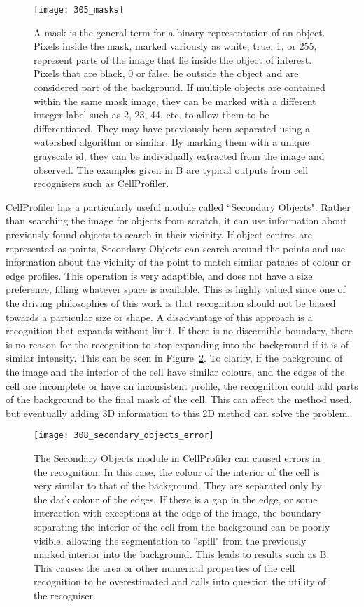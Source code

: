 \begin{figure}[h!]
 \centering
 \texttt{[image: 305\_masks]}
 \caption[Object masks]{
 	A mask is the general term for a binary representation of an object. Pixels inside the mask, marked variously as white, true, 1, or 255, represent parts of the image that lie inside the object of interest. Pixels that are black, 0 or false, lie outside the object and are considered part of the background. If multiple objects are contained within the same mask image, they can be marked with a different integer label such as 2, 23, 44, etc. to allow them to be differentiated. They may have previously been separated using a watershed algorithm or similar. By marking them with a unique grayscale id, they can be individually extracted from the image and observed. The examples given in B are typical outputs from cell recognisers such as CellProfiler.
 }
 \label{fig:masks}
\end{figure}

CellProfiler has a particularly useful module called ``Secondary Objects". Rather than searching the image for objects from scratch, it can use information about previously found objects to search in their vicinity. If object centres are represented as points, Secondary Objects can search around the points and use information about the vicinity of the point to match similar patches of colour or edge profiles. This operation is very adaptible, and does not have a size preference, filling whatever space is available. This is highly valued since one of the driving philosophies of this work is that recognition should not be biased towards a particular size or shape. A disadvantage of this approach is a recognition that expands without limit. If there is no discernible boundary, there is no reason for the recognition to stop expanding into the background if it is of similar intensity. This can be seen in Figure~\ref{fig:secondaryobjecterror}. To clarify, if the background of the image and the interior of the cell have similar colours, and the edges of the cell are incomplete or have an inconsistent profile, the recognition could add parts of the background to the final mask of the cell. This can affect the method used, but eventually adding 3D information to this 2D method can solve the problem.

\begin{figure}[h!]
 \centering
 \texttt{[image: 308\_secondary\_objects\_error]}
 \caption[Secondary object error example]{
 	The Secondary Objects module in CellProfiler can caused errors in the recognition. In this case, the colour of the interior of the cell is very similar to that of the background. They are separated only by the dark colour of the edges. If there is a gap in the edge, or some interaction with exceptions at the edge of the image, the boundary separating the interior of the cell from the background can be poorly visible, allowing the segmentation to ``spill" from the previously marked interior into the background. This leads to results such as B. This causes the area or other numerical properties of the cell recognition to be overestimated and calls into question the utility of the recogniser.
 }
 \label{fig:secondaryobjecterror}
\end{figure}

